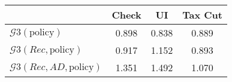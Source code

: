 \begin{tabular}{@{}lccc@{}} 
\toprule 
                          & Check      & UI    & Tax Cut    \\  \midrule 
$\mathcal{G}3(\text{policy})$ & 0.898  & 0.838  & 0.889     \\ 
$\mathcal{G}3(Rec,\text{policy})$ & 0.917  & 1.152  & 0.893     \\ 
$\mathcal{G}3(Rec, AD,\text{policy})$ & 1.351  & 1.492  & 1.070     \\ 
\end{tabular}  
